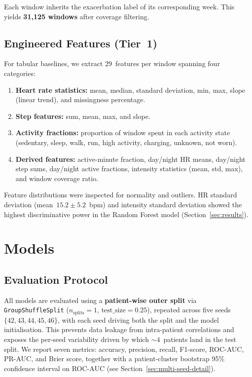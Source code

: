 \documentclass[11pt,a4paper]{article}
\begin{document}
Each window inherits the exacerbation label of its corresponding week.
This yields \textbf{31{,}125 windows} after coverage filtering.

\subsection{Engineered Features (Tier~1)}

For tabular baselines, we extract 29~features per window spanning four
categories:

\begin{enumerate}[nosep]
  \item \textbf{Heart rate statistics:} mean, median, standard deviation, min,
        max, slope (linear trend), and missingness percentage.
  \item \textbf{Step features:} sum, mean, max, and slope.
  \item \textbf{Activity fractions:} proportion of window spent in each activity
        state (sedentary, sleep, walk, run, high activity, charging, unknown,
        not worn).
  \item \textbf{Derived features:} active-minute fraction, day/night HR means,
        day/night step sums, day/night active fractions, intensity statistics
        (mean, std, max), and window coverage ratio.
\end{enumerate}

Feature distributions were inspected for normality and outliers.  HR standard
deviation (mean~$15.2 \pm 5.2$~bpm) and intensity standard deviation showed
the highest discriminative power in the Random Forest model
(Section~\ref{sec:results}).

\section{Models}\label{sec:models}

\subsection{Evaluation Protocol}

All models are evaluated using a \textbf{patient-wise outer split} via
\texttt{GroupShuffleSplit} ($n_{\text{splits}}=1$,
$\text{test\_size}=0.25$), repeated across five seeds
$\{42, 43, 44, 45, 46\}$, with each seed driving both the split and the
model initialisation.  This prevents data leakage from intra-patient
correlations and exposes the per-seed variability driven by which
${\sim}4$~patients land in the test split.  We report seven metrics:
accuracy, precision, recall, F1-score, ROC-AUC, PR-AUC, and Brier score,
together with a patient-cluster bootstrap 95\% confidence interval on
ROC-AUC (see Section~\ref{sec:multi-seed-detail}).
\end{document}
